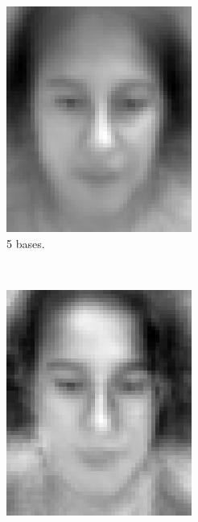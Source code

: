 \documentclass[a4paper, 10pt, conference]{ieeeconf}
\begin{document}
\begin{figure}[!ht]
\begin{subfigure}{0.1\textwidth}
          \includegraphics[width=\textwidth]{src/reface11.png}
          \caption{5 bases.}
        \end{subfigure}
        ~
        \begin{subfigure}{0.1\textwidth}
          \includegraphics[width=\textwidth]{src/reface12.png}

\end{subfigure}
\end{figure}
\end{document}
